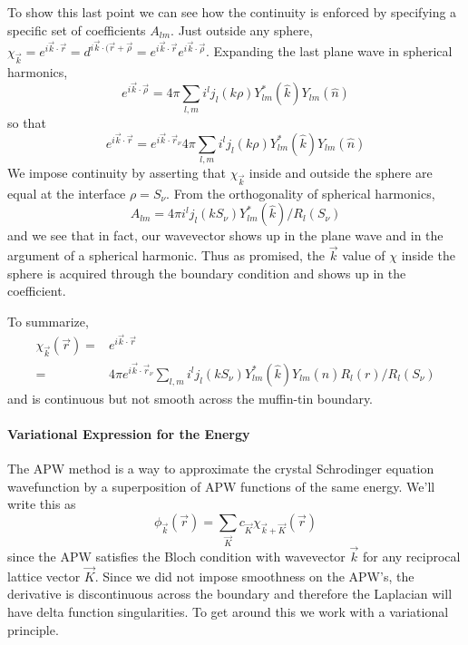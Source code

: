 \documentclass[11pt]{article}
\numberwithin{equation}{section}
\begin{document}
To show this last point we can see how the continuity is enforced by specifying a specific set of coefficients $A_{lm}$. Just outside any sphere, $\chi_{\vec{k}} = e^{i\vec{k}\cdot\vec{r}} = d^{i\vec{k}\cdot(\vec{r} + \vec{\rho}} = e^{i\vec{k}\cdot\vec{r}}e^{i\vec{k}\cdot\vec{\rho}}$. Expanding the last plane wave in spherical harmonics,
\begin{equation}
e^{i\vec{k}\cdot\vec{\rho}} = 4\pi\sum_{l,m}i^l j_l(k\rho)Y^*_{lm}(\hat{k})Y_{lm}(\hat{n})
\end{equation}
so that
\begin{equation}
e^{i\vec{k}\cdot\vec{r}} = e^{i\vec{k}\cdot\vec{r}_{\nu}}4\pi\sum_{l,m}i^l j_l(k\rho)Y^*_{lm}(\hat{k})Y_{lm}(\hat{n})
\end{equation}
We impose continuity by asserting that $\chi_{\vec{k}}$ inside and outside the sphere are equal at the interface $\rho = S_{\nu}$. From the orthogonality of spherical harmonics,
\begin{equation}
A_{lm} = 4\pi i^l j_l(kS_{\nu})Y^*_{lm}(\hat{k})/R_l(S_{\nu})
\end{equation}
and we see that in fact, our wavevector shows up in the plane wave and in the argument of a spherical harmonic. Thus as promised, the $\vec{k}$ value of $\chi$ inside the sphere is acquired through the boundary condition and shows up in the coefficient.

To summarize,
\begin{align}
\chi_{\vec{k}}(\vec{r}) = &e^{i\vec{k}\cdot\vec{r}} \\
= &4\pi e^{i\vec{k}\cdot\vec{r}_{\nu}}\sum_{l,m}i^l j_l(kS_{\nu})Y^*_{lm}(\hat{k})Y_{lm}(\hat{n})R_l(r)/R_l(S_{\nu})
\end{align}
and is continuous but not smooth across the muffin-tin boundary. 

\paragraph{Variational Expression for the Energy}
The APW method is a way to approximate the crystal Schrodinger equation wavefunction by a superposition of APW functions of the same energy. We'll write this as
\begin{equation}
\phi_{\vec{k}}(\vec{r}) = \sum_{\vec{K}}c_{\vec{K}}\chi_{\vec{k} + \vec{K}}(\vec{r})
\end{equation}
since the APW satisfies the Bloch condition with wavevector $\vec{k}$ for any reciprocal lattice vector $\vec{K}$. Since we did not impose smoothness on the APW's, the derivative is discontinuous across the boundary and therefore the Laplacian will have delta function singularities. To get around this we work with a variational principle.
\end{document}
